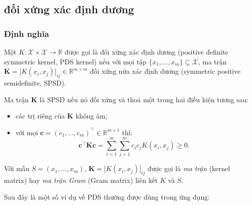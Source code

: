 \subsection{\protect{} đối xứng xác định dương}

\subsubsection{Định nghĩa}

\begin{defn}
  Một  $K\colon \mathcal{X}\times\mathcal{X}\rightarrow\mathbb{R}$
  được gọi là  đối xứng xác định dương (positive definite symmetric
  kernel, PDS kernel) nếu với mọi tập $\{x_1,\dots,x_m\}\subseteq\mathcal{X}$,
  ma trận $\mathbf{K} = \bigl[K(x_i,x_j)\bigr]_{ij} \in \mathbb{R}^{m\times m}$
  đối xứng nửa xác định dương (symmetric positive semidefinite, SPSD).
\end{defn}

Ma trận $\mathbf{K}$ là SPSD nếu nó đối xứng và thoả một trong hai điều kiện
tương sau: \begin{itemize}
  \item các trị riêng của $\mathbf{K}$ không âm;
  \item với mọi  $\mathbf{c} = (c_1,\dots,c_m)^\intercal \in
    \mathbb{R}^{m\times 1}$ thì: \begin{equation}
      \mathbf{c}^\intercal\mathbf{K}\mathbf{c} =
      \sum_{i=1}^m\sum_{j=1}^mc_ic_jK(x_i,x_j) \ge 0.
    \end{equation}
\end{itemize} Với mẫu $S = (x_1,\dots,x_m)$, $\mathbf{K} =
\bigl[K(x_i,x_j)\bigr]_{ij}$ được gọi là \emph{ma trận } (kernel
matrix) hay \emph{ma trận Gram} (Gram matrix) liên kết $K$ và $S$.

Sau đây là một số ví dụ về PDS  thường được dùng trong ứng dụng:

